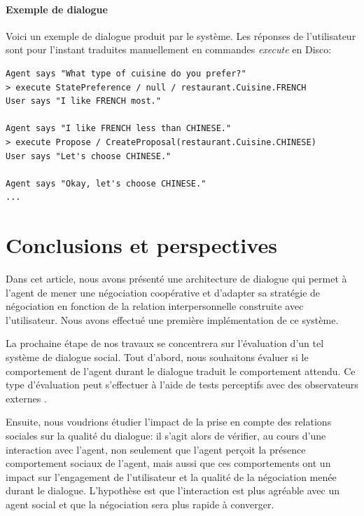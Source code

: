 \documentclass [french]{sig-alternate-05-2015}
\begin{document}
\paragraph{Exemple de dialogue}
Voici un exemple de dialogue produit par le système. Les réponses de l'utilisateur sont pour l'instant traduites manuellement en commandes \emph{execute} en Disco:
{\small
\begin{verbatim}
Agent says "What type of cuisine do you prefer?"
> execute StatePreference / null / restaurant.Cuisine.FRENCH
User says "I like FRENCH most."

Agent says "I like FRENCH less than CHINESE."
> execute Propose / CreateProposal(restaurant.Cuisine.CHINESE)
User says "Let's choose CHINESE."

Agent says "Okay, let's choose CHINESE."
...
\end{verbatim}
}

\section{Conclusions et perspectives}
\label{conc}
Dans cet article, nous avons présenté une architecture de dialogue qui permet à l'agent de mener une négociation coopérative et d'adapter sa stratégie de négociation en fonction de la relation interpersonnelle construite avec l'utilisateur. Nous avons effectué une première implémentation de ce système. 

\par La prochaine étape de nos travaux se concentrera sur l'évaluation d'un tel système de dialogue social. Tout d'abord, nous souhaitons évaluer si le comportement de l'agent durant le dialogue traduit le comportement attendu. Ce type d'évaluation peut s'effectuer à l'aide de tests perceptifs avec des observateurs externes \cite{perceptif-si-on-a-de-la-place}.

\par Ensuite, nous voudrions étudier l'impact de la prise en compte des relations sociales sur la qualité du dialogue: il s'agit alors de vérifier, au cours d'une interaction avec l'agent, non seulement que l'agent perçoit la présence comportement sociaux de l'agent, mais aussi que ces comportements ont un impact sur l'engagement de l'utilisateur et la qualité de la négociation menée durant le dialogue. L'hypothèse est que l'interaction est plus agréable avec un agent social et que la négociation sera plus rapide à converger.
\end{document}
